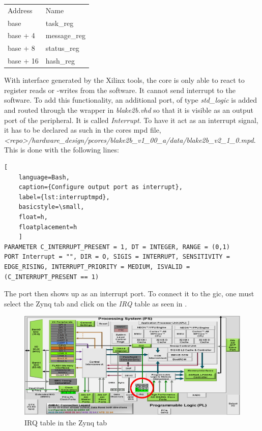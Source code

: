 \begin{tabular}{ll}
	Address & Name \\
	base     & task\_reg\\
	base + 4 & message\_reg\\
	base + 8 & status\_reg\\
	base + 16 & hash\_reg\\
\end{tabular}

With interface generated by the Xilinx tools, the core is only able to react to
register reads or -writes from the software.
It cannot send interrupt to the software.
To add this functionality, an additional port, of type \emph{std\_logic} is
added and routed through the wrapper in \emph{blake2b.vhd} so that it is
visible as an output port of the peripheral.
It is called \emph{Interrupt}.
To have it act as an interrupt signal, it has to be declared as such in the
cores \gls{mpd} file,
\emph{<repo>/hardware_design/pcores/blake2b_v1_00_a/data/blake2b\_v2\_1\_0.mpd}.
This is done with the following lines:

\begin{lstlisting}[
	language=Bash,
	caption={Configure output port as interrupt},
	label={lst:interruptmpd},
	basicstyle=\small,
	float=h,
	floatplacement=h
	]
PARAMETER C_INTERRUPT_PRESENT = 1, DT = INTEGER, RANGE = (0,1)
PORT Interrupt = "", DIR = O, SIGIS = INTERRUPT, SENSITIVITY = EDGE_RISING, INTERRUPT_PRIORITY = MEDIUM, ISVALID = (C_INTERRUPT_PRESENT == 1)
\end{lstlisting}

The port then shows up as an interrupt port.
To connect it to the \gls{gic}, one must select the Zynq tab and click on the
\emph{IRQ} table as seen in .

\begin{figure}[htbp]
\centering
\includegraphics[width=1\textwidth]{sections/methodology/gic}
\caption{\label{fig:gic} IRQ table in the Zynq tab}
\end{figure}

